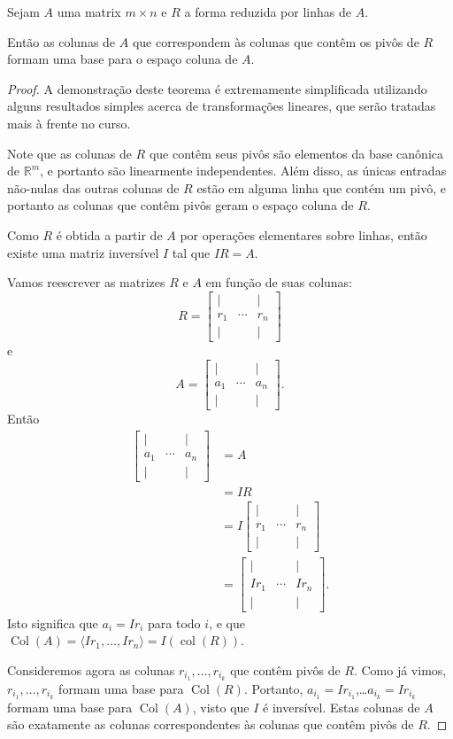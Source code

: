 \begin{theorem}
	Sejam $A$ uma matrix $m\times n$ e $R$ a forma reduzida por linhas de $A$.
	
	Então as colunas de $A$ que correspondem às colunas que contêm os pivôs de $R$ formam uma base para o espaço coluna de $A$.
\end{theorem}
\begin{proof}
	A demonstração deste teorema é extremamente simplificada utilizando alguns resultados simples acerca de transformações lineares, que serão tratadas mais à frente no curso.
	
	Note que as colunas de $R$ que contêm seus pivôs são elementos da base canônica de $\mathbb{R}^m$, e portanto são linearmente independentes. Além disso, as únicas entradas não-nulas das outras colunas de $R$ estão em alguma linha que contém um pivô, e portanto as colunas que contêm pivôs geram o espaço coluna de $R$.
	
	Como $R$ é obtida a partir de $A$ por operações elementares sobre linhas, então existe uma matriz inversível $I$ tal que $IR=A$.
	
	Vamos reescrever as matrizes $R$ e $A$ em função de suas colunas:
	\[R=\begin{bmatrix}|&&|\\
	r_1&\cdots&r_n\\
	|&&|\end{bmatrix}\]
	e
	\[A=\begin{bmatrix}|&&|\\
	a_1&\cdots&a_n\\
	|&&|\end{bmatrix}.\]
	Então
	\begin{align*}
	\begin{bmatrix}|&&|\\
	a_1&\cdots&a_n\\
	|&&|\end{bmatrix}&=A\\
	&=IR\\
	&=I\begin{bmatrix}|&&|\\
	r_1&\cdots&r_n\\
	|&&|\end{bmatrix}\\
	&=\begin{bmatrix}|&&|\\
	Ir_1&\cdots&Ir_n\\
	|&&|\end{bmatrix}.
	\end{align*}
	Isto significa que $a_i=Ir_i$ para todo $i$, e que $\operatorname{Col}(A)=\langle Ir_1,\ldots,Ir_n\rangle=I(\operatorname{col}(R))$.
	
	Consideremos agora as colunas $r_{i_1},\ldots,r_{i_k}$ que contêm pivôs de $R$. Como já vimos, $r_{i_1},\ldots,r_{i_k}$ formam uma base para $\operatorname{Col}(R)$. Portanto, $a_{i_1}=Ir_{i_1}$,\ldots $a_{i_k}=Ir_{i_k}$ formam uma base para $\operatorname{Col}(A)$, visto que $I$ é inversível. Estas colunas de $A$ são exatamente as colunas correspondentes às colunas que contêm pivôs de $R$.
\end{proof}